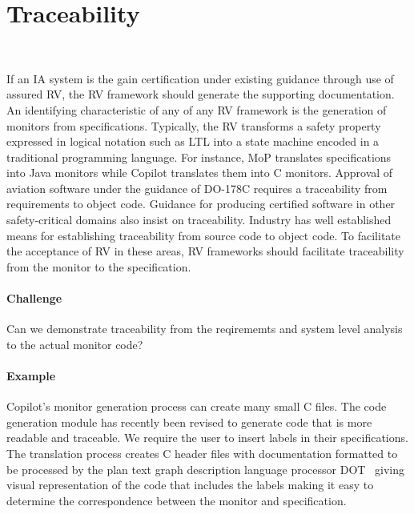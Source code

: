 \section{Traceability}~\label{sec:trace}

\noindent{}

If an IA system is the gain certification under existing guidance
through use of assured RV, the RV framework should generate the
supporting documentation.  An identifying characteristic of any of any
RV framework is the generation of monitors from
specifications. Typically, the RV transforms a safety property
expressed in logical notation such as LTL into a state machine encoded
in a traditional programming language. For instance, MoP translates
specifications into Java monitors while Copilot translates them into C
monitors. Approval of aviation software under the guidance of DO-178C
requires a traceability from requirements to object code. Guidance for
producing certified software in other safety-critical domains also
insist on traceability.  Industry has well established means for
establishing traceability from source code to object code.  To
facilitate the acceptance of RV in these areas, RV frameworks should
facilitate traceability from the monitor to the specification.  

 \paragraph{Challenge} 
Can we demonstrate traceability from the reqirememts and system level analysis
 to the actual monitor code?

\paragraph{Example} Copilot's monitor generation process can create many small C
files. The code generation module has recently been revised to
generate code that is more readable and traceable.  We require the
user to insert labels in their specifications. The translation process
creates C header files with documentation formatted to be processed by
the plan text graph description language processor  DOT~\cite{ZZZZ}
giving  visual representation of the code  that includes the labels
making it easy to determine the correspondence between the monitor and
specification. 



